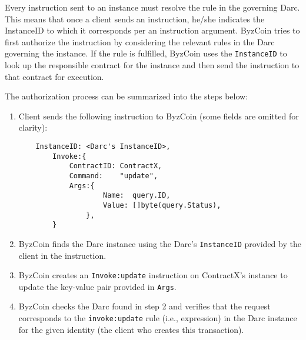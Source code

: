 

Every instruction sent to an instance must resolve the rule in the governing Darc. This means that once a client sends an instruction, he/she indicates the InstanceID to which it corresponds per an instruction argument. ByzCoin tries to first authorize the instruction by considering the relevant rules in the Darc governing the instance. If the rule is fulfilled, ByzCoin uses the \texttt{InstanceID} to look up the responsible contract for the instance and then send the instruction to that contract for execution.




The authorization process can be summarized into the steps below:

\begin{enumerate}
    \item Client sends the following instruction to ByzCoin (some fields are omitted for clarity):
    \begin{verbatim}
    InstanceID: <Darc's InstanceID>,
        Invoke:{
            ContractID: ContractX,
            Command:    "update",
            Args:{
                    Name:  query.ID,             
                    Value: []byte(query.Status), 
                },
        }
    \end{verbatim}
    \item ByzCoin finds the Darc instance using the Darc's \texttt{InstanceID} provided by the client in the instruction.
    \item ByzCoin creates an \texttt{Invoke:update} instruction on ContractX's instance to update the key-value pair provided in \texttt{Args}.
    \item ByzCoin checks the Darc found in step 2 and verifies that the request corresponds to the \texttt{invoke:update} rule (i.e., expression) in the Darc instance for the given identity (the client who creates this transaction).
\end{enumerate}

